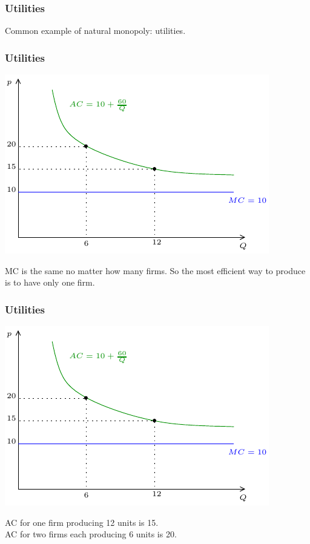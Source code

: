 \documentclass[xcolor=pdftex,dvipsnames]{beamer}
\begin{document}
\begin{frame}
  \frametitle{Utilities}
  Common example of natural monopoly: utilities.

\bigskip

\bigskip

\bigskip

\bigskip



\end{frame}



\begin{frame}
  \frametitle{Utilities}
  
  \begin{center}
    \includegraphics{pics/NatMon}
  \end{center}
MC is the same no matter how many firms. So the most efficient way to
produce is to have only one firm. 
\end{frame}

\begin{frame}
  \frametitle{Utilities}
  
  \begin{center}
    \includegraphics{pics/NatMon}
  \end{center}
AC for one firm producing 12 units is 15.\\
AC for two firms each producing 6 units is 20.
\end{frame}
\end{document}
